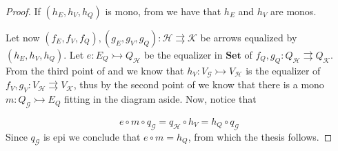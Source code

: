 \documentclass[a4paper,UKenglish,cleveref,pdftex,thm-restate,numberwithinsect]{lipics-v2021}
\newcommand{\Set}{\mathbf{Set}}
\newcommand{\mto}{\rightarrowtail}
\begin{document}
\mn*

\begin{proof}
	If $(h_E, h_V, h_Q)$ is mono, from  we have that $h_E$ and $h_V$ are monos.
	
	\noindent 
	\parbox{2cm}{}   
	\hfill 	\parbox{11cm}{Let now $(f_E, f_V, f_Q), (g_E, g_V, g_Q): \mathcal{H\rightrightarrows K}$ be arrows equalized by $(h_E, h_V, h_Q)$. Let $e\colon E_Q\mto Q_{\mathcal{H}}$ be the equalizer in $\Set$ of $f_Q, g_Q\colon Q_{\mathcal{H}}\rightrightarrows Q_{\mathcal{K}}$. From the third point of  and  we know that $h_V\colon V_{\mathcal{G}}\mto V_{\mathcal{H}} $ is the equalizer of $f_V, g_V\colon V_{\mathcal{H}}\rightrightarrows V_{\mathcal{K}}$, thus by the second point of  we know that there is a mono $m\colon Q_{\mathcal{G}}\mto E_Q$ fitting in the diagram aside. Now, notice that 
	}\hfill 
	\[e\circ m\circ q_{\mathcal{G}}=q_\mathcal{H}\circ h_V=h_{Q}\circ q_{\mathcal{G}}\]
	Since $q_{\mathcal{G}}$ is epi we conclude that $e\circ m=h_Q$, from which the thesis follows.
\end{proof}
\end{document}
